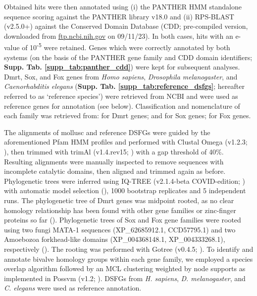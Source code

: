 \documentclass[../main.tex]{subfiles}
\begin{document}
Obtained hits were then annotated using (i) the PANTHER HMM standalone sequence scoring against the PANTHER library v18.0 and (ii) RPS-BLAST (v2.5.0+) against the Conserved Domain Database (CDD; pre-compiled version, downloaded from \href{https://ftp.ncbi.nih.gov/pub/mmdb/cdd/little\_endian/}{ftp.ncbi.nih.gov} on 09/11/23). In both cases, hits with an e-value of 10\textsuperscript{-5} were retained. Genes which were correctly annotated by both systems (on the basis of the PANTHER gene family and CDD domain identifiers; \textbf{Supp. Tab. \ref{supp_tab:panther_cdd}}) were kept for subsequent analyses. Dmrt, Sox, and Fox genes from \textit{Homo sapiens}, \textit{Drosophila melanogaster}, and \textit{Caenorhabditis elegans} (\textbf{Supp. Tab. \ref{supp_tab:reference_dsfgs}}; hereafter referred to as ‘reference species’) were retrieved from NCBI and were used as reference genes for annotation (see below). Classification and nomenclature of each family was retrieved from: \textbf{\cite{mawaribuchi2019independent}} for Dmrt genes; \textbf{\cite{phochanukul2010no}} and \textbf{\cite{sarkar2013sox}} for Sox genes; \textbf{\cite{mazet2003phylogenetic}} for Fox genes.

The alignments of mollusc and reference DSFGs were guided by the aforementioned Pfam HMM profiles and performed with Clustal Omega (v1.2.3; \textbf{\cite{sievers2011fast}}), then trimmed with trimAl (v1.4.rev15; \textbf{\cite{capella2009trimal}}) with a gap threshold of 40\%. Resulting alignments were manually inspected to remove sequences with incomplete catalytic domains, then aligned and trimmed again as before. Phylogenetic trees were inferred using IQ-TREE (v2.1.4-beta COVID-edition; \textbf{\cite{minh2020iq}}) with automatic model selection (\textbf{\cite{kalyaanamoorthy2017modelfinder}}), 1000 bootstrap replicates and 5 independent runs. The phylogenetic tree of Dmrt genes was midpoint rooted, as no clear homology relationship has been found with other gene families or zinc-finger proteins so far (\textbf{\cite{wexler2014pan}}). Phylogenetic trees of Sox and Fox gene families were rooted using two fungi MATA-1 sequences (XP\_62685912.1, CCD57795.1) and two Amoebozoa forkhead-like domains (XP\_004368148.1, XP\_004333268.1), respectively (\textbf{\cite{heenan2016evolution,nakagawa2013dna}}). The rooting was performed with Gotree (v0.4.5; \textbf{\cite{lemoine2021gotree}}). To identify and annotate bivalve homology groups within each gene family, we employed a species overlap algorithm followed by an MCL clustering weighted by node supports as implemented in Possvm (v1.2; \textbf{\cite{grau2021orthology}}). DSFGs from \textit{H. sapiens}, \textit{D. melanogaster}, and \textit{C. elegans} were used as reference annotation.
\end{document}
